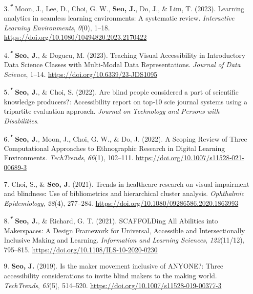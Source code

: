 \documentclass[11pt,a4paper,]{awesome-cv}
\begin{document}
\leavevmode\hypertarget{ref-moonLearningAnalyticsSeamless2023a}{}%
3.\textsuperscript{\emph{\textbf{*}}} Moon, J., Lee, D., Choi, G. W.,
\textbf{Seo, J.}, Do, J., \& Lim, T. (2023). Learning analytics in
seamless learning environments: A systematic review. \emph{Interactive
Learning Environments}, \emph{0}(0), 1--18.
\url{https://doi.org/10.1080/10494820.2023.2170422}

\leavevmode\hypertarget{ref-seoTeachingVisualAccessibility2023}{}%
4.\textsuperscript{\emph{\textbf{*}}} \textbf{Seo, J.}, \& Dogucu, M.
(2023). Teaching Visual Accessibility in Introductory Data Science
Classes with Multi-Modal Data Representations. \emph{Journal of Data
Science}, 1--14. \url{https://doi.org/10.6339/23-JDS1095}

\leavevmode\hypertarget{ref-seo2022csun}{}%
5.\textsuperscript{\emph{\textbf{*}}} \textbf{Seo, J.}, \& Choi, S.
(2022). Are blind people considered a part of scientific knowledge
producers?: Accessibility report on top-10 scie journal systems using a
tripartite evaluation approach. \emph{Journal on Technology and Persons
with Disabilities}.

\leavevmode\hypertarget{ref-seoScopingReviewThree2022}{}%
6.\textsuperscript{\emph{\textbf{*}}} \textbf{Seo, J.}, Moon, J., Choi,
G. W., \& Do, J. (2022). A Scoping Review of Three Computational
Approaches to Ethnographic Research in Digital Learning Environments.
\emph{TechTrends}, \emph{66}(1), 102--111.
\url{https://doi.org/10.1007/s11528-021-00689-3}

\leavevmode\hypertarget{ref-doi:10.1080ux2f09286586.2020.1863993}{}%
7. Choi, S., \& \textbf{Seo, J.} (2021). Trends in healthcare research
on visual impairment and blindness: Use of bibliometrics and
hierarchical cluster analysis. \emph{Ophthalmic Epidemiology},
\emph{28}(4), 277--284.
\url{https://doi.org/10.1080/09286586.2020.1863993}

\leavevmode\hypertarget{ref-seoSCAFFOLDingAllAbilities2021a}{}%
8.\textsuperscript{\emph{\textbf{*}}} \textbf{Seo, J.}, \& Richard, G.
T. (2021). SCAFFOLDing All Abilities into Makerspaces: A Design
Framework for Universal, Accessible and Intersectionally Inclusive
Making and Learning. \emph{Information and Learning Sciences},
\emph{122}(11/12), 795--815.
\url{https://doi.org/10.1108/ILS-10-2020-0230}

\leavevmode\hypertarget{ref-seo2019maker}{}%
9. \textbf{Seo, J.} (2019). Is the maker movement inclusive of ANYONE?:
Three accessibility considerations to invite blind makers to the making
world. \emph{TechTrends}, \emph{63}(5), 514--520.
\url{https://doi.org/10.1007/s11528-019-00377-3}
\end{document}
